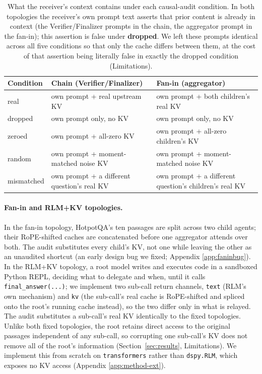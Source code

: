\documentclass[11pt]{article}
\begin{document}
\begin{table}[t]
\centering
\small
\begin{tabular}{lp{3.5cm}p{3.1cm}}
\toprule
\textbf{Condition} & \textbf{Chain (Verifier/Finalizer)} & \textbf{Fan-in (aggregator)} \\
\midrule
real & own prompt + real upstream KV & own prompt + both children's real KV \\
dropped & own prompt only, no KV & own prompt only, no KV \\
zeroed & own prompt + all-zero KV & own prompt + all-zero children's KV \\
random & own prompt + moment-matched noise KV & own prompt + moment-matched noise KV \\
mismatched & own prompt + a different question's real KV & own prompt + a different question's children's real KV \\
\bottomrule
\end{tabular}
\caption{What the receiver's context contains under each causal-audit
condition. In both topologies the receiver's own prompt text asserts
that prior content is already in context (the Verifier/Finalizer
prompts in the chain, the aggregator prompt in the fan-in); this
assertion is false under \textbf{dropped}. We left these prompts
identical across all five conditions so that only the cache differs
between them, at the cost of that assertion being literally false in
exactly the dropped condition (Limitations).}
\label{tab:conditions}
\end{table}

\paragraph{Fan-in and RLM+KV topologies.} In the fan-in topology,
HotpotQA's ten passages are split across two child agents; their
RoPE-shifted caches are concatenated before one aggregator attends over
both. The audit substitutes every child's KV, not one while leaving the
other as an unaudited shortcut (an early design bug we fixed; Appendix
\ref{app:faninbug}). In the RLM+KV topology, a root model writes and
executes code in a sandboxed Python REPL, deciding what to delegate and
when, until it calls \texttt{final\_answer(...)}; we implement two
sub-call return channels, \texttt{text} (RLM's own mechanism) and
\texttt{kv} (the sub-call's real cache is RoPE-shifted and spliced onto
the root's running cache instead), so the two differ only in what is
relayed. The audit substitutes a sub-call's real KV identically to the
fixed topologies. Unlike both fixed topologies, the root retains direct
access to the original passages independent of any sub-call, so
corrupting one sub-call's KV does not remove all of the root's
information (Section~\ref{sec:results}, Limitations). We implement this
from scratch on \texttt{transformers} \citep{transformers2020} rather
than \texttt{dspy.RLM}, which exposes no KV access (Appendix
\ref{app:method-ext}).
\end{document}
